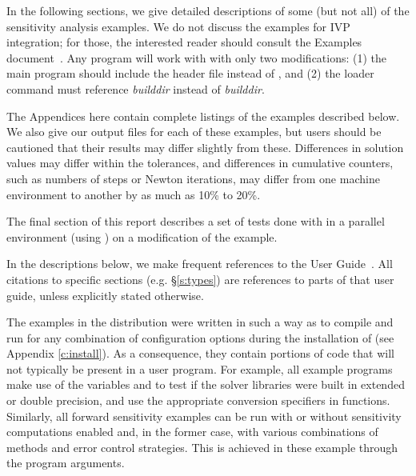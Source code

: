 
\vspace{0.2in}\noindent
In the following sections, we give detailed descriptions of some (but
not all) of the sensitivity analysis examples. We do not discuss the 
examples for IVP integration; for those, the interested reader should consult
the {\cvode} Examples document~\cite{cvode_ex}. Any {\cvode} program
will work with {\cvodes} with only two modifications: (1) the main program
should include the header file  instead of , and
(2) the loader command must reference
{\em builddir} instead of
{\em builddir}.

The Appendices here contain complete listings
of the examples described below.  We also give our output files for
each of these examples, but users should be cautioned that their
results may differ slightly from these.  Differences in solution
values may differ within the tolerances, and differences in cumulative
counters, such as numbers of steps or Newton iterations, may differ
from one machine environment to another by as much as 10\% to 20\%.

The final section of this report describes a set of tests done with
{\cvodes} in a parallel environment (using {\nvecp}) on a modification of
the  example.

In the descriptions below, we make frequent references to the {\cvodes}
User Guide~\cite{cvodes_ug}.  All citations to specific sections
(e.g. \S\ref{s:types}) are references to parts of that user guide, unless
explicitly stated otherwise.

\vspace{0.2in}
The examples in the {\cvodes} distribution were written in such a way as
to compile and run for any combination of configuration options during
the installation of {\sundials} (see Appendix \ref{c:install}). As a consequence,
they contain portions of code that will not typically be present in a
user program. For example, all example programs make use of the
variables  and 
to test if the solver libraries
were built in extended or double precision, and use the appropriate conversion 
specifiers in  functions. Similarly, all forward sensitivity
examples can be run with or without sensitivity computations enabled and,
in the former case, with various combinations of methods and error control 
strategies. This is achieved in these example through the program arguments.

